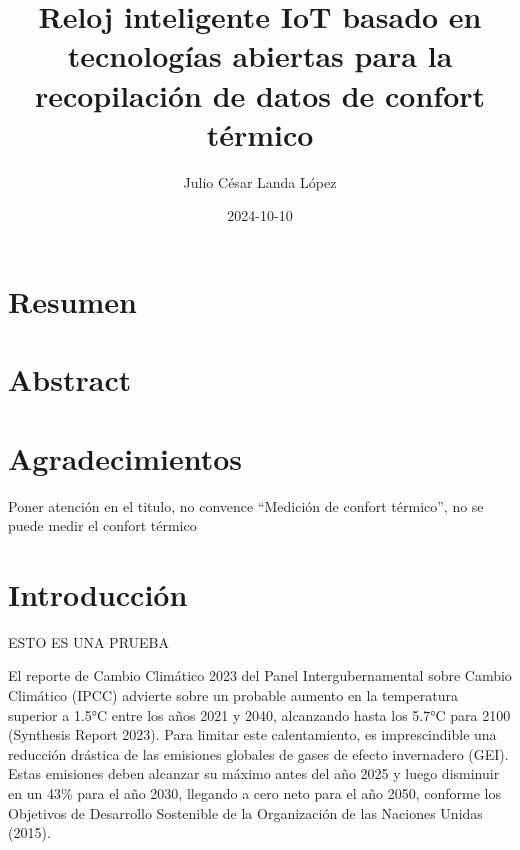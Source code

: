 \documentclass[
  letterpaper,
  DIV=11,
  numbers=noendperiod]{scrreport}
\title{Reloj inteligente IoT basado en tecnologías abiertas para la
recopilación de datos de confort térmico}
\author{Julio César Landa López}
\date{2024-10-10}
\renewcommand*\contentsname{Tabla de contenidos}
\newcommand\contentsname{Tabla de contenidos}
\begin{document}
\maketitle
\ifdefined\Shaded\renewenvironment{Shaded}{\begin{tcolorbox}[breakable, sharp corners, boxrule=0pt, interior hidden, borderline west={3pt}{0pt}{shadecolor}, frame hidden, enhanced]}{\end{tcolorbox}}\fi

\renewcommand*\contentsname{Tabla de contenidos}
{
\hypersetup{linkcolor=}
\setcounter{tocdepth}{2}
\tableofcontents
}
\listoffigures
\listoftables
{}

\hypertarget{resumen}{%
\chapter*{Resumen}\label{resumen}}



\hypertarget{abstract}{%
\chapter*{Abstract}\label{abstract}}



\hypertarget{agradecimientos}{%
\chapter*{Agradecimientos}\label{agradecimientos}}


Poner atención en el titulo, no convence ``Medición de confort
térmico'', no se puede medir el confort térmico


\hypertarget{introducciuxf3n}{%
\chapter{Introducción}\label{introducciuxf3n}}

ESTO ES UNA PRUEBA

El reporte de Cambio Climático 2023 del Panel Intergubernamental sobre
Cambio Climático (IPCC) advierte sobre un probable aumento en la
temperatura superior a 1.5°C entre los años 2021 y 2040, alcanzando
hasta los 5.7°C para 2100 (Synthesis Report 2023). Para limitar este
calentamiento, es imprescindible una reducción drástica de las emisiones
globales de gases de efecto invernadero (GEI). Estas emisiones deben
alcanzar su máximo antes del año 2025 y luego disminuir en un 43\% para
el año 2030, llegando a cero neto para el año 2050, conforme los
Objetivos de Desarrollo Sostenible de la Organización de las Naciones
Unidas (2015).
\end{document}
